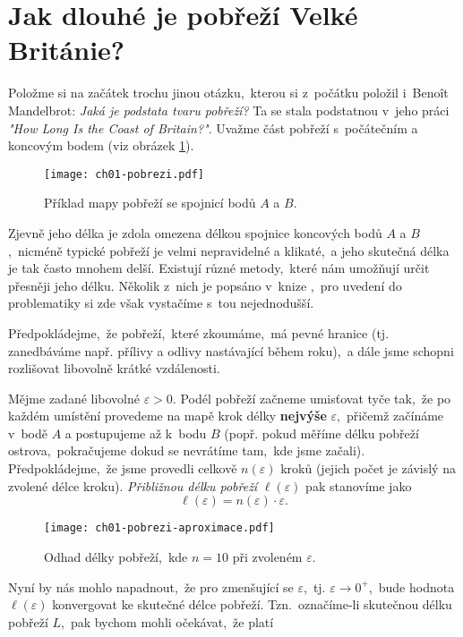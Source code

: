 \section{Jak dlouhé je pobřeží Velké Británie?}\label{sec:pobrezi_velke_britanie}
Položme si na začátek trochu jinou otázku,~kterou si z~počátku položil i~Benoît Mandelbrot: \emph{Jaká je podstata tvaru pobřeží?} Ta se stala podstatnou v~jeho práci \emph{"How Long Is the Coast of Britain?"}. Uvažme část pobřeží s~počátečním a koncovým bodem (viz obrázek \ref{fig:pobrezi}).
\begin{figure}[h]
    \centering
    \texttt{[image: ch01-pobrezi.pdf]}
    \caption{Příklad mapy pobřeží se spojnicí bodů $A$ a $B$.}
    \label{fig:pobrezi}
\end{figure}
Zjevně jeho délka je zdola omezena délkou spojnice koncových bodů $A$ a $B$,~nicméně typické pobřeží je velmi nepravidelné a klikaté,~a jeho skutečná délka je tak často mnohem delší. Existují různé metody,~které nám umožňují určit přesněji jeho délku. Několik z~nich je popsáno v~knize \citep[str. 79]{Mandelbrot1983},~pro uvedení do problematiky si zde však vystačíme s~tou nejednodušší.\par
Předpokládejme,~že pobřeží,~které zkoumáme,~má pevné hranice (tj. zanedbáváme např. přílivy a odlivy nastávající během roku),~a dále jsme schopni rozlišovat libovolně krátké vzdálenosti.\par
Mějme zadané libovolné $\varepsilon>0$. Podél pobřeží začneme umisťovat tyče tak,~že po každém umístění provedeme na mapě krok délky \textbf{nejvýše} $\varepsilon$,~přičemž začínáme v~bodě $A$ a postupujeme až k~bodu $B$ (popř. pokud měříme délku pobřeží ostrova,~pokračujeme dokud se nevrátíme tam,~kde jsme začali). Předpokládejme,~že jsme provedli celkově $n(\varepsilon)$ kroků (jejich počet je závislý na zvolené délce kroku). \emph{Přibližnou délku pobřeží} $\ell(\varepsilon)$ pak stanovíme jako
\begin{equation*}
    \ell(\varepsilon)=n(\varepsilon)\cdot\varepsilon.
\end{equation*}
\begin{figure}[h]
    \centering
    \texttt{[image: ch01-pobrezi-aproximace.pdf]}
    \caption{Odhad délky pobřeží,~kde $n=10$ při zvoleném $\varepsilon$.}
    \label{fig:pobrezi_aproximace}
\end{figure}
Nyní by nás mohlo napadnout,~že pro zmenšující se $\varepsilon$,~tj. $\varepsilon\to0^+$,~bude hodnota $\ell(\varepsilon)$ konvergovat ke skutečné délce pobřeží. Tzn.~označíme-li skutečnou délku pobřeží $L$,~pak bychom mohli očekávat,~že platí
